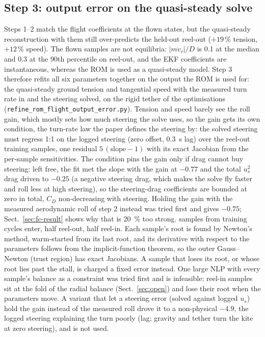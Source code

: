 \documentclass[11pt,a4paper]{article}
\newcommand{\code}[1]{\texttt{\small #1}}
\begin{document}
\subsection{Step 3: output error on the quasi-steady solve}
Steps 1--2 match the flight coefficients at the flown states, but the
quasi-steady reconstruction with them still over-predicts the held-out
reel-out ($+19\,\%$ tension, $+12\,\%$ speed). The flown samples are not
equilibria: $|m\dot v_\tau|/D$ is 0.1 at the median and 0.3 at the 90th
percentile on reel-out, and the EKF coefficients are instantaneous, whereas
the ROM is used as a quasi-steady model. Step 3 therefore refits all six
parameters together on the output the ROM is used for: the quasi-steady
ground tension and tangential speed with the measured turn rate in and the
steering solved, on the rigid tether of the optimisations
(\code{refine\_rom\_flight\_output\_error.py}). Tension and speed barely
see the roll gain, which mostly sets how much steering the solve uses, so
the gain gets its own condition, the turn-rate law the paper defines the
steering by: the solved steering must regress 1:1 on the logged steering
(zero offset, \SI{0.3}{\second} lag) over the reel-out training samples, one
residual $5\,(\text{slope}-1)$ with its exact Jacobian from the per-sample
sensitivities. The condition pins the gain only if drag cannot buy
steering: left free, the fit met the slope with the gain at $-0.77$ and the
total $u_s^2$ drag driven to $-0.25$ (a negative steering drag, which makes
the solve fly faster and roll less at high steering), so the steering-drag
coefficients are bounded at zero in total, $C_D$ non-decreasing with
steering. Holding the gain with the measured aerodynamic roll of step 2
instead was tried first and gives $-0.75$; Sect.~\ref{sec:fc-result} shows
why that is \SI{20}{\percent} too strong. \fcSamples{} samples from \fcCycles{} training cycles
enter, half reel-out, half reel-in. Each sample's root is found by Newton's
method, warm-started from its last root, and its derivative with respect to
the parameters follows from the implicit-function theorem, so the outer
Gauss--Newton (trust region) has exact Jacobians. A sample that loses its
root, or whose root lies past the stall, is charged a fixed error instead.
One large NLP with every sample's balance as a constraint was tried first
and is infeasible: reel-in samples sit at the fold of the radial balance
(Sect.~\ref{sec:open}) and lose their root when the parameters move. A
variant that let a steering error (solved against logged $u_s$) hold the
gain instead of the measured roll drove it to a non-physical $-4.9$, the
logged steering explaining the turn poorly (lag; gravity and tether turn
the kite at zero steering), and is not used.
\end{document}

